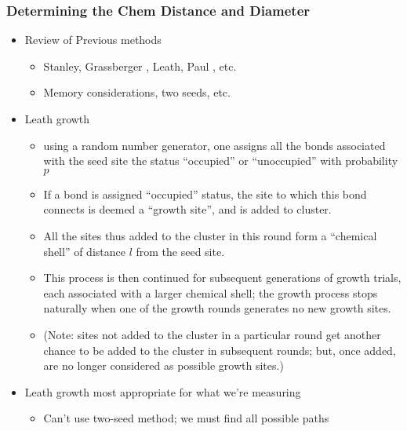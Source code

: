 \documentclass[11pt]{article}
\begin{document}
\subsubsection{Determining the Chem Distance and Diameter}
\label{sec-5-2-2}
\begin{itemize}

\item Review of Previous methods
\label{sec-5-2-2-1}%
\begin{itemize}

\item Stanley, Grassberger \cite{Gr99}, Leath, Paul \cite{Paul2001}, etc.\\
\label{sec-5-2-2-1-1}%
\item Memory considerations, two seeds, etc.\\
\label{sec-5-2-2-1-2}%
\end{itemize} %

\item Leath growth \cite{Leath}
\label{sec-5-2-2-2}%
\begin{itemize}

\item using a random number generator, one assigns all the bonds associated with the seed site the status ``occupied'' or ``unoccupied'' with probability $p$\\
\label{sec-5-2-2-2-1}%
\item If a bond is assigned ``occupied'' status, the site to which this bond connects is deemed a ``growth site'', and is added to cluster.\\
\label{sec-5-2-2-2-2}%
\item All the sites thus added to the cluster in this round form a ``chemical shell'' of distance $l$ from the seed site.\\
\label{sec-5-2-2-2-3}%
\item This process is then continued for subsequent generations of growth trials, each associated with a larger chemical shell; the growth process stops naturally when one of the growth rounds generates no new growth sites.\\
\label{sec-5-2-2-2-4}%
\item (Note: sites not added to the cluster in a particular round get another chance to be added to the cluster in subsequent rounds; but, once added, are no longer considered as possible growth sites.)\\
\label{sec-5-2-2-2-5}%
\end{itemize} %

\item Leath growth most appropriate for what we're measuring
\label{sec-5-2-2-3}%
\begin{itemize}

\item Can't use two-seed method; we must find all possible paths\\
\label{sec-5-2-2-3-1}%
\end{itemize} %
\end{itemize} %
\end{document}
